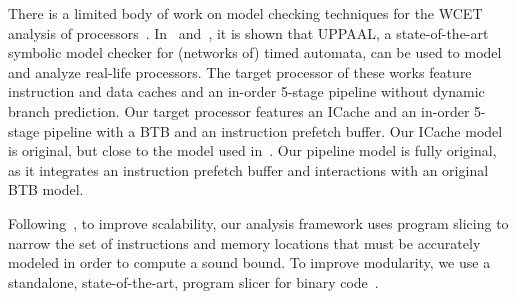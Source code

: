 There is a limited body of work on model checking techniques for the WCET analysis of processors~\cite{Metzner2004,Gustavsson2010,Dalsgaard2010,Cassez2013}.
In~\cite{Dalsgaard2010} and~\cite{Cassez2013}, it is shown that UPPAAL, a state-of-the-art symbolic model checker for (networks of) timed automata, can be used to model and analyze real-life processors.
The target processor of these works feature instruction and data caches and an in-order 5-stage pipeline without dynamic branch prediction.
Our target processor features an ICache and an in-order 5-stage pipeline with a BTB and an instruction prefetch buffer.
Our ICache model is original, but close to the model used in~\cite{Cassez2013}.
Our pipeline model is fully original, as it integrates an instruction prefetch buffer and interactions with an original BTB model.

Following~\cite{Cassez2013}, to improve scalability, our analysis framework uses program slicing to narrow the set of instructions and memory locations that must be accurately modeled in order to compute a sound bound.
To improve modularity, we use a standalone, state-of-the-art, program slicer for binary code~\cite{wcet16_mangean}.
